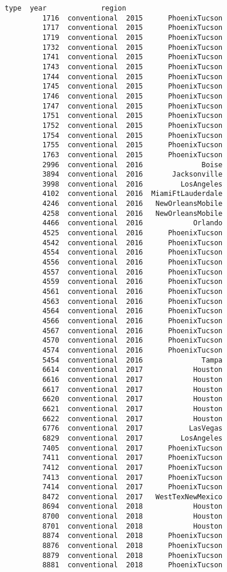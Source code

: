\documentclass[11pt]{article}
\begin{document}
\begin{Verbatim}[commandchars=\\\{\}]
                       type  year             region  
         1716  conventional  2015      PhoenixTucson  
         1717  conventional  2015      PhoenixTucson  
         1719  conventional  2015      PhoenixTucson  
         1732  conventional  2015      PhoenixTucson  
         1741  conventional  2015      PhoenixTucson  
         1743  conventional  2015      PhoenixTucson  
         1744  conventional  2015      PhoenixTucson  
         1745  conventional  2015      PhoenixTucson  
         1746  conventional  2015      PhoenixTucson  
         1747  conventional  2015      PhoenixTucson  
         1751  conventional  2015      PhoenixTucson  
         1752  conventional  2015      PhoenixTucson  
         1754  conventional  2015      PhoenixTucson  
         1755  conventional  2015      PhoenixTucson  
         1763  conventional  2015      PhoenixTucson  
         2996  conventional  2016              Boise  
         3894  conventional  2016       Jacksonville  
         3998  conventional  2016         LosAngeles  
         4102  conventional  2016  MiamiFtLauderdale  
         4246  conventional  2016   NewOrleansMobile  
         4258  conventional  2016   NewOrleansMobile  
         4466  conventional  2016            Orlando  
         4525  conventional  2016      PhoenixTucson  
         4542  conventional  2016      PhoenixTucson  
         4554  conventional  2016      PhoenixTucson  
         4556  conventional  2016      PhoenixTucson  
         4557  conventional  2016      PhoenixTucson  
         4559  conventional  2016      PhoenixTucson  
         4561  conventional  2016      PhoenixTucson  
         4563  conventional  2016      PhoenixTucson  
         4564  conventional  2016      PhoenixTucson  
         4566  conventional  2016      PhoenixTucson  
         4567  conventional  2016      PhoenixTucson  
         4570  conventional  2016      PhoenixTucson  
         4574  conventional  2016      PhoenixTucson  
         5454  conventional  2016              Tampa  
         6614  conventional  2017            Houston  
         6616  conventional  2017            Houston  
         6617  conventional  2017            Houston  
         6620  conventional  2017            Houston  
         6621  conventional  2017            Houston  
         6622  conventional  2017            Houston  
         6776  conventional  2017           LasVegas  
         6829  conventional  2017         LosAngeles  
         7405  conventional  2017      PhoenixTucson  
         7411  conventional  2017      PhoenixTucson  
         7412  conventional  2017      PhoenixTucson  
         7413  conventional  2017      PhoenixTucson  
         7414  conventional  2017      PhoenixTucson  
         8472  conventional  2017   WestTexNewMexico  
         8694  conventional  2018            Houston  
         8700  conventional  2018            Houston  
         8701  conventional  2018            Houston  
         8874  conventional  2018      PhoenixTucson  
         8876  conventional  2018      PhoenixTucson  
         8879  conventional  2018      PhoenixTucson  
         8881  conventional  2018      PhoenixTucson  
\end{Verbatim}
            
\end{document}
